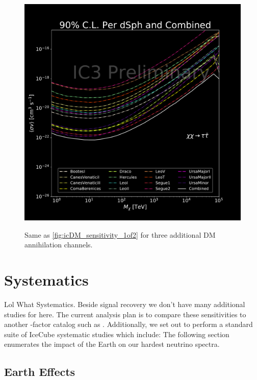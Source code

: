 \begin{figure}[b]
{        \includegraphics[scale=0.3]{figures/ic_DM/dm_plots/tautau_money_plot_comb.pdf}
    }
    \caption{Same as \cref{fig:icDM_sensitivity_1of2} for three additional DM annihilation channels.}
    \label{fig:icDM_sensitivity_2of2}
\end{figure}

\section{Systematics} \label{sec:icDM_Systematics}

Lol What Systematics.
Beside signal recovery we don't have many additional studies for here.
The current analysis plan is to compare these sensitivities to another \J-factor catalog such as \LS \cite{DM_Strigari20}.
Additionally, we set out to perform a standard suite of IceCube systematic studies which include: 
The following section enumerates the impact of the Earth on our hardest neutrino spectra.

\subsection{Earth Effects} \label{sec:icDM_eart_effects}


